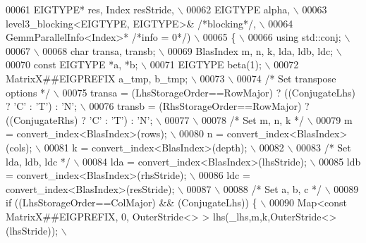 \begin{DoxyCode}
00061 \textcolor{preprocessor}{  EIGTYPE* res, Index resStride, \(\backslash\)}
00062 \textcolor{preprocessor}{  EIGTYPE alpha, \(\backslash\)}
00063 \textcolor{preprocessor}{  level3\_blocking<EIGTYPE, EIGTYPE>& }\textcolor{comment}{/*blocking*/}\textcolor{preprocessor}{, \(\backslash\)}
00064 \textcolor{preprocessor}{  GemmParallelInfo<Index>* }\textcolor{comment}{/*info = 0*/}\textcolor{preprocessor}{) \(\backslash\)}
00065 \textcolor{preprocessor}{\{ \(\backslash\)}
00066 \textcolor{preprocessor}{  using std::conj; \(\backslash\)}
00067 \textcolor{preprocessor}{\(\backslash\)}
00068 \textcolor{preprocessor}{  char transa, transb; \(\backslash\)}
00069 \textcolor{preprocessor}{  BlasIndex m, n, k, lda, ldb, ldc; \(\backslash\)}
00070 \textcolor{preprocessor}{  const EIGTYPE *a, *b; \(\backslash\)}
00071 \textcolor{preprocessor}{  EIGTYPE beta(1); \(\backslash\)}
00072 \textcolor{preprocessor}{  MatrixX##EIGPREFIX a\_tmp, b\_tmp; \(\backslash\)}
00073 \textcolor{preprocessor}{\(\backslash\)}
00074 \textcolor{preprocessor}{}\textcolor{comment}{/* Set transpose options */}\textcolor{preprocessor}{ \(\backslash\)}
00075 \textcolor{preprocessor}{  transa = (LhsStorageOrder==RowMajor) ? ((ConjugateLhs) ? 'C' : 'T') : 'N'; \(\backslash\)}
00076 \textcolor{preprocessor}{  transb = (RhsStorageOrder==RowMajor) ? ((ConjugateRhs) ? 'C' : 'T') : 'N'; \(\backslash\)}
00077 \textcolor{preprocessor}{\(\backslash\)}
00078 \textcolor{preprocessor}{}\textcolor{comment}{/* Set m, n, k */}\textcolor{preprocessor}{ \(\backslash\)}
00079 \textcolor{preprocessor}{  m = convert\_index<BlasIndex>(rows);  \(\backslash\)}
00080 \textcolor{preprocessor}{  n = convert\_index<BlasIndex>(cols);  \(\backslash\)}
00081 \textcolor{preprocessor}{  k = convert\_index<BlasIndex>(depth); \(\backslash\)}
00082 \textcolor{preprocessor}{\(\backslash\)}
00083 \textcolor{preprocessor}{}\textcolor{comment}{/* Set lda, ldb, ldc */}\textcolor{preprocessor}{ \(\backslash\)}
00084 \textcolor{preprocessor}{  lda = convert\_index<BlasIndex>(lhsStride); \(\backslash\)}
00085 \textcolor{preprocessor}{  ldb = convert\_index<BlasIndex>(rhsStride); \(\backslash\)}
00086 \textcolor{preprocessor}{  ldc = convert\_index<BlasIndex>(resStride); \(\backslash\)}
00087 \textcolor{preprocessor}{\(\backslash\)}
00088 \textcolor{preprocessor}{}\textcolor{comment}{/* Set a, b, c */}\textcolor{preprocessor}{ \(\backslash\)}
00089 \textcolor{preprocessor}{  if ((LhsStorageOrder==ColMajor) && (ConjugateLhs)) \{ \(\backslash\)}
00090 \textcolor{preprocessor}{    Map<const MatrixX##EIGPREFIX, 0, OuterStride<> > lhs(\_lhs,m,k,OuterStride<>(lhsStride)); \(\backslash\)}

\end{DoxyCode}
